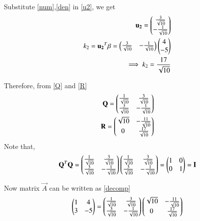 \documentclass[journal,12pt,twocolumn]{IEEEtran}
\begin{document}
Substitute \eqref{num},\eqref{den} in \eqref{u2}, we get
\begin{align}
    \mathbf{u_2}=\begin{pmatrix}\frac{3}{\sqrt{10}} \\ -\frac{1}{\sqrt{10}}\end{pmatrix}\\
    k_2=\mathbf{u_2}^T\beta=\begin{pmatrix}\frac{3}{\sqrt{10}} & -\frac{1}{\sqrt{10}}\end{pmatrix}\begin{pmatrix}4 \\ -5\end{pmatrix}\\
    \implies k_2=\frac{17}{\sqrt{10}}
\end{align}

Therefore, from \eqref{Q} and \eqref{R}
\begin{align}
    \mathbf{Q}=\begin{pmatrix}\frac{1}{\sqrt{10}} & \frac{3}{\sqrt{10}} \\ \frac{3}{\sqrt{10}} & -\frac{1}{\sqrt{10}}\end{pmatrix}\\
    \mathbf{R}=\begin{pmatrix}\sqrt{10} & -\frac{11}{\sqrt{10}} \\ 0 & \frac{17}{\sqrt{10}}\end{pmatrix}
\end{align}
Note that,
\begin{align}
    \mathbf{Q}^T\mathbf{Q}=\begin{pmatrix}\frac{1}{\sqrt{10}} & \frac{3}{\sqrt{10}} \\ \frac{3}{\sqrt{10}} & -\frac{1}{\sqrt{10}}\end{pmatrix}\begin{pmatrix}\frac{1}{\sqrt{10}} & \frac{3}{\sqrt{10}} \\ \frac{3}{\sqrt{10}} & -\frac{1}{\sqrt{10}}\end{pmatrix}=\begin{pmatrix}1 & 0\\ 0 & 1\end{pmatrix}=\mathbf{I}
\end{align}

Now matrix $\vec{A}$ can be written as \eqref{decomp}
\begin{align}
    \begin{pmatrix}1 & 4 \\ 3 & -5\end{pmatrix}=\begin{pmatrix}\frac{1}{\sqrt{10}} & \frac{3}{\sqrt{10}} \\ \frac{3}{\sqrt{10}} & -\frac{1}{\sqrt{10}}\end{pmatrix}\begin{pmatrix}\sqrt{10} & -\frac{11}{\sqrt{10}} \\ 0 & \frac{17}{\sqrt{10}}\end{pmatrix}
\end{align}
\end{document}
